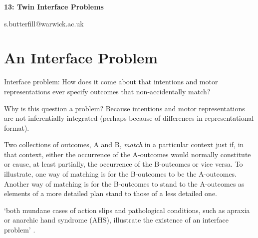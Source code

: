 \documentclass[12pt]{extarticle}
\date{}
\makeatletter
\def \ititle {Philosophical Psychology}
\def \iemail{s.butterfill@warwick.ac.uk}
\makeatother
\begin{document}
\begin{multicols*}{3}

\setlength\footnotesep{1em}









      
\def \ititle {13: Twin Interface Problems}
 
\begin{center}
 
{\Large
 
\textbf{\ititle}
 
}
 
 
 
\iemail %
 
\end{center}
 
 
 
\section{An Interface Problem}
 
Interface problem: How does it come about that intentions and motor representations
ever specify outcomes that non-accidentally match?

Why is this question a problem? Because intentions and motor representations are not
inferentially integrated (perhaps because of differences in representational format).
 
Two collections of outcomes, A and B, \emph{match} in a particular context just if, in that context,
either the occurrence of the A-outcomes would normally constitute or cause, at least partially, the
occurrence of the B-outcomes or vice versa. To illustrate, one way of matching is for the B-outcomes
to be the A-outcomes. Another way of matching is for the B-outcomes to stand to the A-outcomes as
elements of a more detailed plan stand to those of a less detailed one.

‘both mundane cases of action slips and pathological conditions, such as apraxia or anarchic hand
syndrome (AHS), illustrate the existence of an interface problem’ 
\citep[p.~7]{mylopoulos:2016_intentions}.
 

\end{multicols*}
\end{document}
